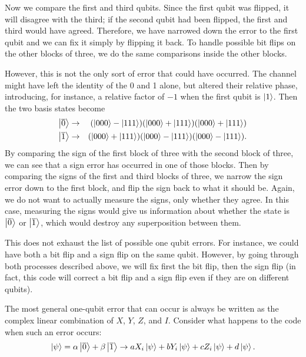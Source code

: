 Now we compare the first and third qubits.  Since the first qubit was
flipped, it will disagree with the third; if the second qubit had been
flipped, the first and third would have agreed.  Therefore, we have
narrowed down the error to the first qubit and we can fix it simply by
flipping it back.  To handle possible bit flips on the other blocks of three,
we do the same comparisons inside the other blocks.

However, this is not the only sort of error that could have occurred.  The
channel might have left the identity of the 0 and 1 alone, but altered their
relative phase, introducing, for instance, a relative factor of $-1$ when
the first qubit is $\ket{1}$.  Then the two basis states become
\begin{eqnarray}
	\ket{\overline{0}} & \rightarrow & (\ket{000} - \ket{111}) (\ket{000} +
	\ket{111}) (\ket{000} + \ket{111}) \\
	\ket{\overline{1}} & \rightarrow & (\ket{000} + \ket{111}) (\ket{000} -
	\ket{111}) (\ket{000} - \ket{111}).
\end{eqnarray}
By comparing the sign of the first block of three with the second block of
three, we can see that a sign error has occurred in one of those blocks.
Then by comparing the signs of the first and third blocks of three, we
narrow the sign error down to the first block, and flip the sign back to
what it should be.  Again, we do not want to actually measure the signs,
only whether they agree.  In this case, measuring the signs would give us
information about whether the state is $\ket{\overline{0}}$ or
$\ket{\overline{1}}$, which would destroy any superposition between
them.

This does not exhaust the list of possible one qubit errors.  For instance, we
could have both a bit flip and a sign flip on the same qubit.  However, by
going through both processes described above, we will fix first the bit flip,
then the sign flip (in fact, this code will correct a bit flip and a sign flip
even if they are on different qubits).

The most general one-qubit error that can occur is always be written as the complex linear combination of $X$, $Y$, $Z$, and $I$.
Consider what happens to the code when such an error occurs:
\begin{equation}
	\ket{\psi} = \alpha \ket{\overline{0}} + \beta \ket{\overline{1}}
	\rightarrow a X_{i} \ket{\psi} + b Y_{i} \ket{\psi} + c Z_{i} \ket{\psi} +
	d \ket{\psi}.
\end{equation}

